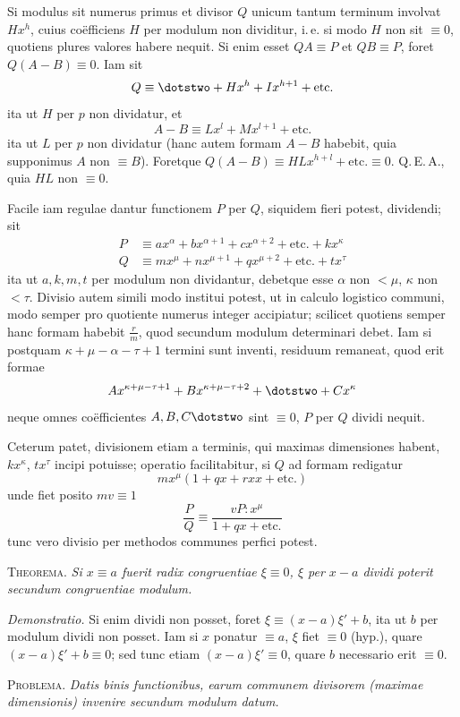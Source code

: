 Si modulus sit numerus primus et divisor $Q$ unicum tantum terminum involvat $Hx^h$, cuius coëfficiens $H$ per modulum non dividitur, i.\,e. si modo $H$ non sit $\equiv0$, quotiens plures valores habere nequit. Si enim esset $QA\equiv P$ et $QB\equiv P$, foret $Q(A-B)\equiv0$. Iam sit
\[
Q\equiv\dotstwo+Hx^h+Ix^{h+1}+\text{etc.}
\]
ita ut $H$ per $p$ non dividatur, et
\[
A-B\equiv Lx^l+Mx^{l+1}+\text{etc.}
\]
ita ut $L$ per $p$ non dividatur (hanc autem formam $A-B$ habebit, quia supponimus $A$ non $\equiv B$). Foretque $Q(A-B)\equiv HLx^{h+l}+\text{etc.}\equiv0$. Q.\,E.\,A., quia $HL$ non $\equiv0$.

Facile iam regulae dantur functionem $P$ per $Q$, siquidem fieri potest, dividendi; sit
\[
\begin{aligned}
P&\equiv ax^\alpha+bx^{\alpha+1}+cx^{\alpha+2}+\text{etc.}+kx^\kappa\\
Q&\equiv mx^\mu+nx^{\mu+1}+qx^{\mu+2}+\text{etc.}+tx^\tau
\end{aligned}
\]
ita ut $a,k,m,t$ per modulum non dividantur, debetque esse $\alpha$ non $<\mu$, $\kappa$ non $<\tau$. Divisio autem simili modo institui potest, ut in calculo logistico communi, modo semper pro quotiente numerus integer accipiatur; scilicet quotiens semper
hanc formam habebit $\frac rm$, quod secundum modulum determinari debet. Iam si postquam $\kappa+\mu-\alpha-\tau+1$ termini sunt inventi, residuum remaneat, quod erit formae
\[
Ax^{\kappa+\mu-\tau+1}+Bx^{\kappa+\mu-\tau+2}+\dotstwo+Cx^\kappa
\]
neque omnes coëfficientes $A,B,C\dotstwo$ sint $\equiv0$, $P$ per $Q$ dividi nequit.

Ceterum patet, divisionem etiam a terminis, qui maximas dimensiones habent, $kx^\kappa$, $tx^\tau$ incipi potuisse; operatio facilitabitur, si $Q$ ad formam redigatur
\[
mx^\mu(1+qx+rxx+\text{etc.})
\]
unde fiet posito $mv\equiv1$
\[
\frac PQ\equiv\frac{vP:x^\mu}{1+qx+\text{etc.}}
\]
tunc vero divisio per methodos communes perfici potest.

\textsc{Theorema.} \emph{Si $x\equiv a$ fuerit radix congruentiae $\xi\equiv0$, $\xi$ per $x-a$ dividi poterit secundum congruentiae modulum.}

\emph{Demonstratio.} Si enim dividi non posset, foret $\xi\equiv(x-a)\xi'+b$, ita ut $b$ per modulum dividi non posset. Iam si $x$ ponatur $\equiv a$, $\xi$ fiet $\equiv0$ (hyp.), quare $(x-a)\xi'+b\equiv0$; sed tunc etiam $(x-a)\xi'\equiv0$, quare $b$ necessario erit $\equiv0$.

\textsc{Problema.} \emph{Datis binis functionibus, earum communem divisorem (maximae dimensionis) invenire secundum modulum datum.}

